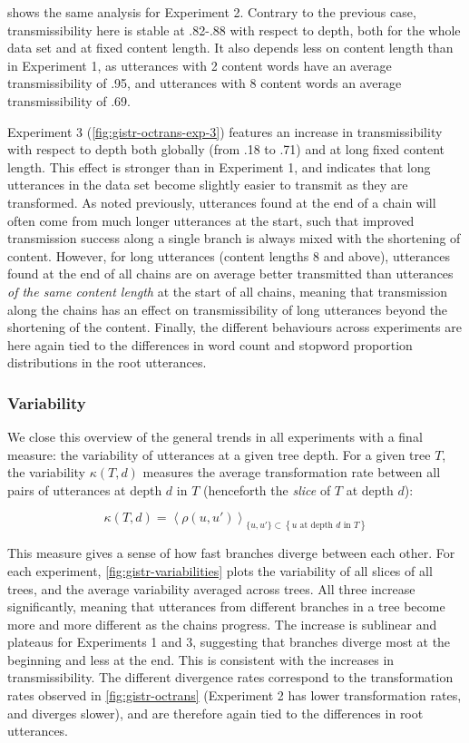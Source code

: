 \documentclass[a4paper,fleqn]{cas-dc}
\begin{document}
 shows the same analysis for Experiment 2.
Contrary to the previous case, transmissibility here is stable at
.82-.88 with respect to depth, both for the whole data set and at fixed
content length. It also depends less on content length than in
Experiment 1, as utterances with 2 content words have an average
transmissibility of .95, and utterances with 8 content words an average
transmissibility of .69.

Experiment 3 (\cref{fig:gistr-octrans-exp-3}) features an increase in
transmissibility with respect to depth both globally (from .18 to .71)
and at long fixed content length. This effect is stronger than in
Experiment 1, and indicates that long utterances in the data set become
slightly easier to transmit as they are transformed. As noted
previously, utterances found at the end of a chain will often come from
much longer utterances at the start, such that improved transmission
success along a single branch is always mixed with the shortening of
content. However, for long utterances (content lengths 8 and above),
utterances found at the end of all chains are on average better
transmitted than utterances \emph{of the same content length} at the
start of all chains, meaning that transmission along the chains has an
effect on transmissibility of long utterances beyond the shortening of
the content. Finally, the different behaviours across experiments are
here again tied to the differences in word count and stopword proportion
distributions in the root utterances.

\subsubsection{Variability}\label{variability}

We close this overview of the general trends in all experiments with a
final measure: the variability of utterances at a given tree depth. For
a given tree \(T\), the variability \(\kappa(T, d)\) measures the
average transformation rate between all pairs of utterances at depth
\(d\) in \(T\) (henceforth the \emph{slice} of \(T\) at depth \(d\)):

\[\kappa(T, d) = \left< \rho(u, u') \right>_{\{u, u'\} \subset \left\{ \text{$u$ at depth $d$ in $T$}\right\} }\]

This measure gives a sense of how fast branches diverge between each
other. For each experiment, \cref{fig:gistr-variabilities} plots the
variability of all slices of all trees, and the average variability
averaged across trees. All three increase significantly, meaning that
utterances from different branches in a tree become more and more
different as the chains progress. The increase is sublinear and plateaus
for Experiments 1 and 3, suggesting that branches diverge most at the
beginning and less at the end. This is consistent with the increases in
transmissibility. The different divergence rates correspond to the
transformation rates observed in \cref{fig:gistr-octrans} (Experiment 2
has lower transformation rates, and diverges slower), and are therefore
again tied to the differences in root utterances.
\end{document}
